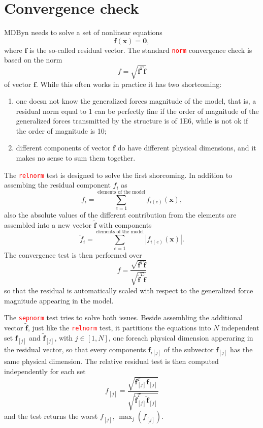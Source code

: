 \documentclass[10pt,fleqn,subeqn]{report}
\newcommand{\T}[1]{\bm{#1}}
\newcommand{\kw}[1]{\textcolor{red}{\texttt{#1}}}
\begin{document}
\section{Convergence check}
MDByn needs to solve a set of nonlinear equations
\begin{equation}
\T f(\T x)=\T 0,
\end{equation}
where $\T{f}$ is the so-called residual vector.
The standard \kw{norm} convergence check is based on the
norm 
\begin{equation}
f = \sqrt{\T{f}^T\T{f}}
\end{equation}
of vector $\T{f}$. While this often works in practice it has two shortcoming:
\begin{enumerate}
\item one doesn not know the generalized forces magnitude of the model, that is, a residual norm equal to
 1 can be perfectly fine if the order of magnitude of the generalized forces transmitted by the structure
 is of 1E6, while is not ok if the order of magnitude is 10;
\item different components of vector $\T{f}$ do have different physical dimensions, and it
makes no sense to sum them together.
\end{enumerate}
The \kw{relnorm} test is designed to solve the first shorcoming. 
In addition to assembing the residual component $f_i$ as
\begin{equation}
f_{i}=\sum_{e=1}^{\text{elements of the model}}f_{i(e)}(\T x),
\end{equation}
also the absolute values of the different contribution from the
elements are assembled into a new vector $\tilde{\T{f}}$ with components
\begin{equation}
\tilde{f}_{i} = \sum_{e=1}^{\text{elements of the model}}|f_{i(e)}(\T x)|.
\end{equation}
The convergence test is then performed over
\begin{equation}
f = \frac{\displaystyle \sqrt{\T{f}^T\T{f}}}{\displaystyle\sqrt{\tilde{\T{f}}^T\tilde{\T{f}}}}
\end{equation}
so that the residual is automatically scaled with respect to the generalized force magnitude
appearing in the model.

The \kw{sepnorm} test tries to solve both issues. Beside assembling the additional vector $\tilde{\T{f}}$,
just like the \kw{relnorm} test, it partitions the equations into $N$ independent set $\T{f}_{[j]}$ and
$\tilde{\T{f}}_{[j]}$, with $j\in[1,N]$, one foreach physical dimension apperaring in the residual vector, 
so that every components $\T{f}_{i[j]}$ of the subvector $\T{f}_{[j]}$ has the same physical dimension. 
The relative residual test is then computed independently for each set
\begin{equation}
f_{[j]} = \frac{\displaystyle \sqrt{\T{f}_{[j]}^T\T{f}_{[j]}}}
	{\displaystyle\sqrt{\tilde{\T{f}}_{[j]}^T\tilde{\T{f}}_{[j]}}}
\end{equation}
and the test returns the worst $f_{[j]}$, $\max_j(f_{[j]})$.
\end{document}
